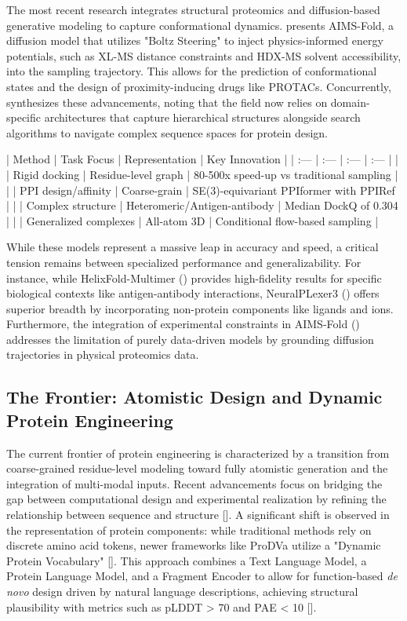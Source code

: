 \documentclass[11pt]{article}
\begin{document}
The most recent research integrates structural proteomics and diffusion-based generative modeling to capture conformational dynamics. \citep{2605.26192} presents AIMS-Fold, a diffusion model that utilizes "Boltz Steering" to inject physics-informed energy potentials, such as XL-MS distance constraints and HDX-MS solvent accessibility, into the sampling trajectory. This allows for the prediction of conformational states and the design of proximity-inducing drugs like PROTACs. Concurrently, \citep{2605.11189} synthesizes these advancements, noting that the field now relies on domain-specific architectures that capture hierarchical structures alongside search algorithms to navigate complex sequence spaces for protein design.

| Method | Task Focus | Representation | Key Innovation |
| :--- | :--- | :--- | :--- |
| \citep{2111.07786} | Rigid docking | Residue-level graph | 80-500x speed-up vs traditional sampling |
| \citep{2310.18515} | PPI design/affinity | Coarse-grain | SE(3)-equivariant PPIformer with PPIRef |
| \citep{2404.10260} | Complex structure | Heteromeric/Antigen-antibody | Median DockQ of 0.304 |
| \citep{2412.10743} | Generalized complexes | All-atom 3D | Conditional flow-based sampling |

While these models represent a massive leap in accuracy and speed, a critical tension remains between specialized performance and generalizability. For instance, while HelixFold-Multimer (\citep{2404.10260}) provides high-fidelity results for specific biological contexts like antigen-antibody interactions, NeuralPLexer3 (\citep{2412.10743}) offers superior breadth by incorporating non-protein components like ligands and ions. Furthermore, the integration of experimental constraints in AIMS-Fold (\citep{2605.26192}) addresses the limitation of purely data-driven models by grounding diffusion trajectories in physical proteomics data.

\subsection{The Frontier: Atomistic Design and Dynamic Protein Engineering}

The current frontier of protein engineering is characterized by a transition from coarse-grained residue-level modeling toward fully atomistic generation and the integration of multi-modal inputs. Recent advancements focus on bridging the gap between computational design and experimental realization by refining the relationship between sequence and structure [\citep{2408.17241}]. A significant shift is observed in the representation of protein components: while traditional methods rely on discrete amino acid tokens, newer frameworks like ProDVa utilize a "Dynamic Protein Vocabulary" [\citep{2505.18966}]. This approach combines a Text Language Model, a Protein Language Model, and a Fragment Encoder to allow for function-based \textit{de novo} design driven by natural language descriptions, achieving structural plausibility with metrics such as pLDDT > 70 and PAE < 10 [\citep{2505.18966}].
\end{document}

